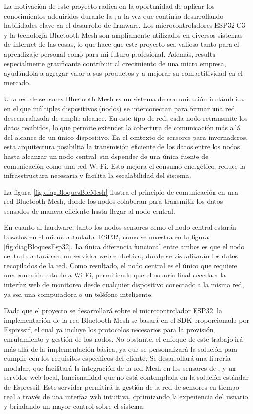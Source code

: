 \documentclass[
11pt, %
]{charter}
\begin{document}
La motivación de este proyecto radica en la oportunidad de aplicar los conocimientos adquiridos durante la {\degreename}, a la vez que continúo desarrollando habilidades clave en el desarrollo de firmware. Los microcontroladores ESP32-C3 y la tecnología Bluetooth Mesh son ampliamente utilizados en diversos sistemas de internet de las cosas, lo que hace que este proyecto sea valioso tanto para el aprendizaje personal como para mi futuro profesional. Además, resulta especialmente gratificante contribuir al crecimiento de una micro empresa, ayudándola a agregar valor a sus productos y a mejorar su competitividad en el mercado.

Una red de sensores Bluetooth Mesh es un sistema de comunicación inalámbrica en el que múltiples dispositivos (nodos) se interconectan para formar una red descentralizada de amplio alcance. En este tipo de red, cada nodo retransmite los datos recibidos, lo que permite extender la cobertura de comunicación más allá del alcance de un único dispositivo. En el contexto de sensores para invernaderos, esta arquitectura posibilita la transmisión eficiente de los datos entre los nodos hasta alcanzar un nodo central, sin depender de una única fuente de comunicación como una red Wi-Fi. Esto mejora el consumo energético, reduce la infraestructura necesaria y facilita la escalabilidad del sistema.

La figura \ref{fig:diagBloquesBleMesh} ilustra el principio de comunicación en una red Bluetooth Mesh, donde los nodos colaboran para transmitir los datos sensados de manera eficiente hasta llegar al nodo central.

En cuanto al hardware, tanto los nodos sensores como el nodo central estarán basados en el microcontrolador ESP32, como se muestra en la figura \ref{fig:diagBloquesEsp32}. La única diferencia funcional entre ambos es que el nodo central contará con un servidor web embebido, donde se visualizarán los datos recopilados de la red. Como resultado, el nodo central es el único que requiere una conexión estable a Wi-Fi, permitiendo que el usuario final acceda a la interfaz web de monitoreo desde cualquier dispositivo conectado a la misma red, ya sea una computadora o un teléfono inteligente.

Dado que el proyecto se desarrollará sobre el microcontrolador ESP32, la implementación de la red Bluetooth Mesh se basará en el SDK proporcionado por Espressif, el cual ya incluye los protocolos necesarios para la provisión, enrutamiento y gestión de los nodos. No obstante, el enfoque de este trabajo irá más allá de la implementación básica, ya que se personalizará la solución para cumplir con los requisitos específicos del cliente. Se desarrollará una librería modular, que facilitará la integración de la red Mesh en los sensores de {\empclientename}, y un servidor web local, funcionalidad que no está contemplada en la solución estándar de Espressif. Este servidor permitirá la gestión de la red de sensores en tiempo real a través de una interfaz web intuitiva, optimizando la experiencia del usuario y brindando un mayor control sobre el sistema.
\end{document}
